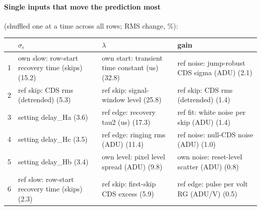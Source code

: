 \paragraph{Single inputs that move the prediction most} (shuffled one at a time across all rows; RMS change, \%):
\begin{center}\footnotesize
\begin{tabular}{rp{}p{}p{}}
\toprule
 & $\sigma_e$ & $\lambda$ & gain \\
\midrule
1 & own slow: row-start recovery time (skips) (15.2) & own start: transient time constant (us) (32.8) & ref noise: jump-robust CDS sigma (ADU) (2.1) \\
2 & ref skip: CDS rms (detrended) (5.3) & ref skip: signal-window level (25.8) & ref skip: CDS rms (detrended) (1.4) \\
3 & setting delay\_Ha (3.6) & ref edge: recovery tau2 (us) (17.3) & ref fit: white noise per skip (ADU) (1.4) \\
4 & setting delay\_Hc (3.5) & ref edge: ringing rms (ADU) (11.4) & ref noise: null-CDS noise (ADU) (1.0) \\
5 & setting delay\_Hb (3.4) & own level: pixel level spread (ADU) (9.8) & own noise: reset-level scatter (ADU) (0.8) \\
6 & ref slow: row-start recovery time (skips) (2.3) & ref skip: first-skip CDS excess (5.9) & ref edge: pulse per volt RG (ADU/V) (0.5) \\
\bottomrule
\end{tabular}
\end{center}
